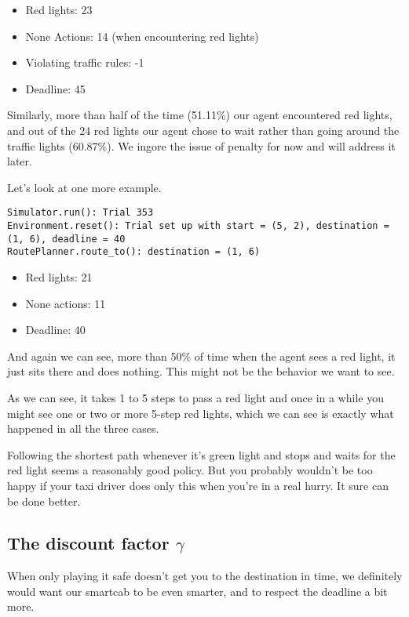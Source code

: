 \documentclass{article}
\providecommand{\tightlist}{%
      \setlength{\itemsep}{0pt}\setlength{\parskip}{0pt}}
\begin{document}
\begin{itemize}
\tightlist
\item
  Red lights: 23
\item
  None Actions: 14 (when encountering red lights)
\item
  Violating traffic rules: -1
\item
  Deadline: 45
\end{itemize}

Similarly, more than half of the time (51.11\%) our agent encountered
red lights, and out of the 24 red lights our agent chose to wait rather
than going around the traffic lights (60.87\%). We ingore the issue of
penalty for now and will address it later.

Let's look at one more example.

\begin{verbatim}
Simulator.run(): Trial 353
Environment.reset(): Trial set up with start = (5, 2), destination = (1, 6), deadline = 40
RoutePlanner.route_to(): destination = (1, 6)
\end{verbatim}

\begin{itemize}
\tightlist
\item
  Red lights: 21
\item
  None actions: 11
\item
  Deadline: 40
\end{itemize}

And again we can see, more than 50\% of time when the agent sees a red
light, it just sits there and does nothing. This might not be the
behavior we want to see.

As we can see, it takes 1 to 5 steps to pass a red light and once in a
while you might see one or two or more 5-step red lights, which we can
see is exactly what happened in all the three cases.

Following the shortest path whenever it's green light and stops and
waits for the red light seems a reasonably good policy. But you probably
wouldn't be too happy if your taxi driver does only this when you're in
a real hurry. It sure can be done better.

\subsection{\texorpdfstring{The discount factor
\(\gamma\)}{The discount factor \textbackslash{}gamma}}\label{the-discount-factor-gamma}

When only playing it safe doesn't get you to the destination in time, we
definitely would want our smartcab to be even smarter, and to respect
the deadline a bit more.
\end{document}
